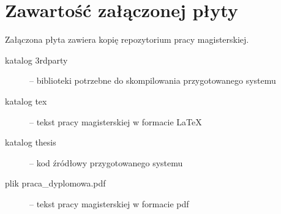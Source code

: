 \chapter{Zawartość załączonej płyty}

Załączona płyta zawiera kopię repozytorium pracy magisterskiej.

\begin{description}

\item[katalog 3rdparty] --
biblioteki potrzebne do skompilowania przygotowanego systemu

\item[katalog tex] --
tekst pracy magisterskiej w formacie \LaTeX

\item[katalog thesis] --
kod źródłowy przygotowanego systemu

\item[plik praca_dyplomowa.pdf] --
tekst pracy magisterskiej w formacie pdf


\end{description}